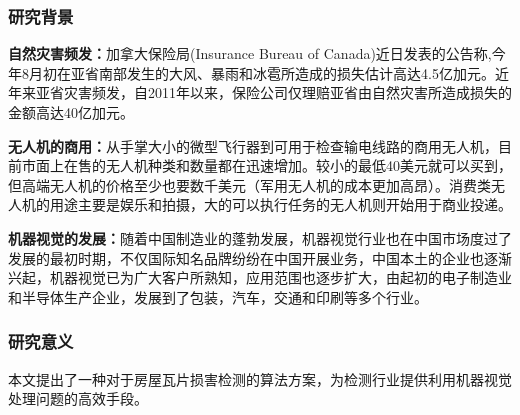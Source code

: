 \subsubsection{研究背景}
\textbf{自然灾害频发：}加拿大保险局(Insurance Bureau of Canada)近日发表的公告称,今年8月初在亚省南部发生的大风、暴雨和冰雹所造成的损失估计高达4.5亿加元。近年来亚省灾害频发，自2011年以来，保险公司仅理赔亚省由自然灾害所造成损失的金额高达40亿加元。

\textbf{无人机的商用：}从手掌大小的微型飞行器到可用于检查输电线路的商用无人机，目前市面上在售的无人机种类和数量都在迅速增加。较小的最低40美元就可以买到，但高端无人机的价格至少也要数千美元（军用无人机的成本更加高昂）。消费类无人机的用途主要是娱乐和拍摄，大的可以执行任务的无人机则开始用于商业投递。

\textbf{机器视觉的发展：}随着中国制造业的蓬勃发展，机器视觉行业也在中国市场度过了发展的最初时期，不仅国际知名品牌纷纷在中国开展业务，中国本土的企业也逐渐兴起，机器视觉已为广大客户所熟知，应用范围也逐步扩大，由起初的电子制造业和半导体生产企业，发展到了包装，汽车，交通和印刷等多个行业。

\subsubsection{研究意义}
本文提出了一种对于房屋瓦片损害检测的算法方案，为检测行业提供利用机器视觉处理问题的高效手段。